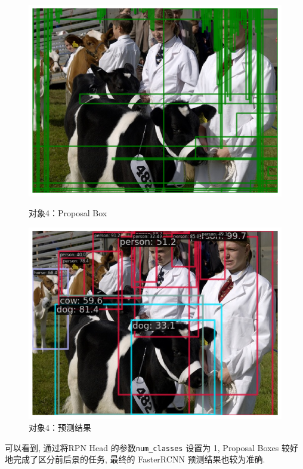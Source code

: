 \documentclass[notitlepage,cs4size,punct,oneside]{ctexrep}
\numberwithin{equation}{chapter}
\theoremstyle{mystyle}
\begin{document}
\begin{figure}[!htpb]
    \centering
    \begin{minipage}[t]{0.49\textwidth}
    \includegraphics[width=\linewidth]{4ppbox.png}
    \caption{对象4：Proposal Box}
    \label{mAPfrcnn}
    \end{minipage}
    \begin{minipage}[t]{0.49\textwidth}
    \includegraphics[width=\linewidth]{4result.png}
    \caption{对象4：预测结果}
    \label{frcnn_loss}
    \end{minipage}
\end{figure}

可以看到, 通过将RPN Head 的参数\lstinline|num_classes| 设置为 1, Proposal Boxes 较好地完成了区分前后景的任务, 最终的 FasterRCNN 预测结果也较为准确.
\end{document}

